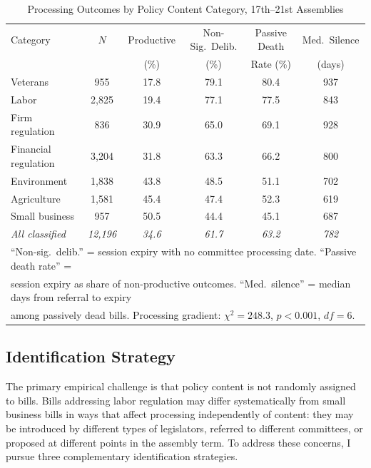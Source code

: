 \documentclass[11pt]{article}
\begin{document}
\begin{table}[H]
\centering
\caption{Processing Outcomes by Policy Content Category, 17th--21st Assemblies}
\label{tab:desc}
\begin{tabular}{lccccc}
\toprule
Category & $N$ & Productive & Non-Sig.\ Delib. & Passive Death & Med.\ Silence \\
 & & (\%) & (\%) & Rate (\%) & (days) \\
\midrule
Veterans & 955 & 17.8 & 79.1 & 80.4 & 937 \\
Labor & 2,825 & 19.4 & 77.1 & 77.5 & 843 \\
Firm regulation & 836 & 30.9 & 65.0 & 69.1 & 928 \\
Financial regulation & 3,204 & 31.8 & 63.3 & 66.2 & 800 \\
Environment & 1,838 & 43.8 & 48.5 & 51.1 & 702 \\
Agriculture & 1,581 & 45.4 & 47.4 & 52.3 & 619 \\
Small business & 957 & 50.5 & 44.4 & 45.1 & 687 \\
\midrule
\textit{All classified} & \textit{12,196} & \textit{34.6} & \textit{61.7} & \textit{63.2} & \textit{782} \\
\bottomrule
\multicolumn{6}{l}{\footnotesize ``Non-sig.\ delib.'' = session expiry with no committee processing date. ``Passive death rate'' =} \\
\multicolumn{6}{l}{\footnotesize session expiry as share of non-productive outcomes. ``Med.\ silence'' = median days from referral to expiry} \\
\multicolumn{6}{l}{\footnotesize among passively dead bills. Processing gradient: $\chi^2 = 248.3$, $p < 0.001$, $df = 6$.} \\
\end{tabular}
\end{table}

\subsection{Identification Strategy}
\label{sec:ident}

The primary empirical challenge is that policy content is not randomly assigned to bills. Bills addressing labor regulation may differ systematically from small business bills in ways that affect processing independently of content: they may be introduced by different types of legislators, referred to different committees, or proposed at different points in the assembly term. To address these concerns, I pursue three complementary identification strategies.
\end{document}
